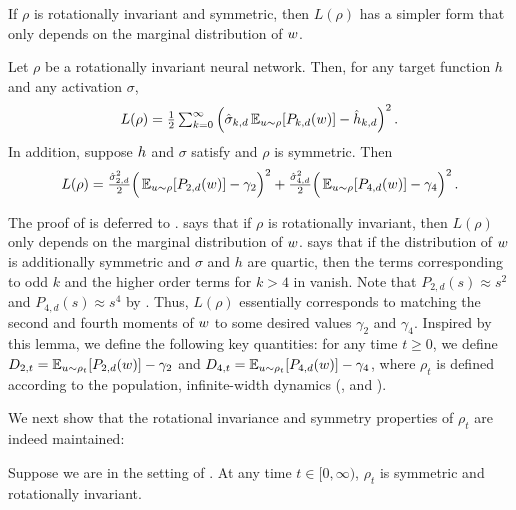If $\rho$ is rotationally invariant and symmetric, then $L(\rho)$ has a simpler form that only depends on the marginal distribution of $w$.

\begin{lemma} \label{lemma:population_loss_formula}
Let $\rho$ be a rotationally invariant neural network. Then, for any target function $h$ and any activation $\sigma$,
\begin{align} \label{eq:rot_inv_loss_formula}
\textstyle{L(\rho)
 = \frac{1}{2}\sum_{k = 0}^\infty \Big( \hat{\sigma}_{k, d}\operatorname*{\mathbb{E}}_{u \sim \rho} [P_{k, d}(w)] - \hat{h}_{k,d} \Big)^2 \,.}
\end{align}
In addition, suppose $h$ and $\sigma$ satisfy  and $\rho$ is symmetric. Then
\begin{align} \label{eq:symmetric_loss_formula}
\textstyle{L(\rho)
 = \frac{\hat{\sigma}_{2, d}^2}{2} \Big( \operatorname*{\mathbb{E}}_{u \sim \rho} [P_{2, d}(w)] - \gamma_2\Big)^2 + \frac{\hat{\sigma}_{4, d}^2}{2} \Big( \operatorname*{\mathbb{E}}_{u \sim \rho} [P_{4, d}(w)] - \gamma_4 \Big)^2 \,.}
\end{align}
\end{lemma}

The proof of  is deferred to .  says that if $\rho$ is rotationally invariant, then $L(\rho)$ only depends on the marginal distribution of $w$.  says that if the distribution of $w$ is additionally symmetric and $\sigma$ and $h$ are quartic,  then the terms corresponding to odd $k$ and the higher order terms for $k > 4$ in  vanish. Note that $P_{2,d}(s) \approx s^2$ and $P_{4,d}(s) \approx s^4$ by . Thus, $L(\rho)$ essentially corresponds to matching the second and fourth moments of $w$ to some desired values $\gamma_2$ and $\gamma_4$. Inspired by this lemma, we define the following key quantities: for any time $t \geq 0$, we define $D_{2, t} = \operatorname*{\mathbb{E}}_{u \sim \rho_t}[{P_{2, d}}(w)] - \gamma_2$ and $D_{4, t} = \operatorname*{\mathbb{E}}_{u \sim \rho_t}[{P_{4, d}}(w)] - \gamma_4$, where $\rho_t$ is defined according to the population, infinite-width dynamics (,  and ).

We next show that the rotational invariance and symmetry properties of $\rho_t$ are indeed maintained:

\begin{lemma}\label{lemma:rho_rotational_invariant}
Suppose we are in the setting of . At any time $t \in [0, \infty)$, $\rho_t$ is symmetric and rotationally invariant.
\end{lemma}


